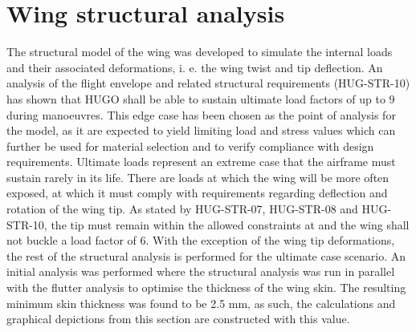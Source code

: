  \section{Wing structural analysis}
\label{sec:wing_structural_analysis}


The structural model of the wing was developed to simulate the internal loads and their associated deformations, i. e. the wing twist and tip deflection. An analysis of the flight envelope and related structural requirements (HUG-STR-10) has shown that HUGO shall be able to sustain ultimate load factors of up to 9 during manoeuvres. This edge case has been chosen as the point of analysis for the model, as it are expected to yield limiting load and stress values which can further be used for material selection and to verify compliance with design requirements. Ultimate loads represent an extreme case that the airframe must sustain rarely in its life. There are loads at which the wing will be more often exposed, at which it must comply with requirements regarding deflection and rotation of the wing tip. As stated by HUG-STR-07, HUG-STR-08 and HUG-STR-10, the tip must remain within the allowed constraints at and the wing shall not buckle a load factor of 6. With the exception of the wing tip deformations, the rest of the structural analysis is performed for the ultimate case scenario. An initial analysis was performed where the structural analysis was run in parallel with the flutter analysis to optimise the thickness of the wing skin. The resulting minimum skin thickness was found to be 2.5 mm, as such, the calculations and graphical depictions from this section are constructed with this value.


